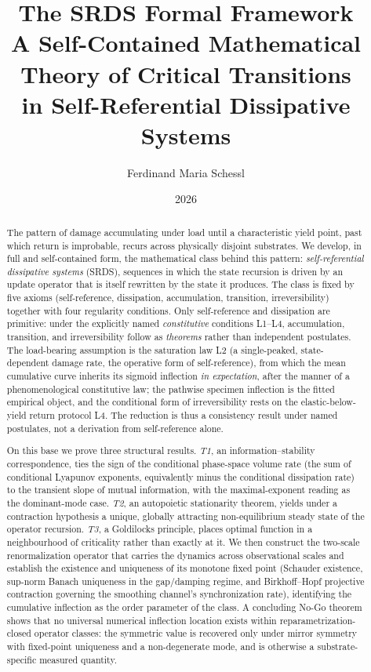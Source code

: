 \documentclass[11pt]{article}
\title{\textbf{The SRDS Formal Framework}\\[0.3em]
\large A Self-Contained Mathematical Theory of Critical Transitions\\ in Self-Referential Dissipative Systems}
\author{Ferdinand Maria Schessl}
\date{2026}
\theoremstyle{plain}
\theoremstyle{definition}
\theoremstyle{remark}
\begin{document}
\maketitle

\begin{abstract}
The pattern of damage accumulating under load until a characteristic yield point, past which return is improbable, recurs across physically disjoint substrates. We develop, in full and self-contained form, the mathematical class behind this pattern: \emph{self-referential dissipative systems} (SRDS), sequences in which the state recursion is driven by an update operator that is itself rewritten by the state it produces. The class is fixed by five axioms (self-reference, dissipation, accumulation, transition, irreversibility) together with four regularity conditions. Only self-reference and dissipation are primitive: under the explicitly named \emph{constitutive} conditions L1--L4, accumulation, transition, and irreversibility follow as \emph{theorems} rather than independent postulates. The load-bearing assumption is the saturation law L2 (a single-peaked, state-dependent damage rate, the operative form of self-reference), from which the mean cumulative curve inherits its sigmoid inflection \emph{in expectation}, after the manner of a phenomenological constitutive law; the pathwise specimen inflection is the fitted empirical object, and the conditional form of irreversibility rests on the elastic-below-yield return protocol L4. The reduction is thus a consistency result under named postulates, not a derivation from self-reference alone.

On this base we prove three structural results. \emph{T1}, an information--stability correspondence, ties the sign of the conditional phase-space volume rate (the sum of conditional Lyapunov exponents, equivalently minus the conditional dissipation rate) to the transient slope of mutual information, with the maximal-exponent reading as the dominant-mode case. \emph{T2}, an autopoietic stationarity theorem, yields under a contraction hypothesis a unique, globally attracting non-equilibrium steady state of the operator recursion. \emph{T3}, a Goldilocks principle, places optimal function in a neighbourhood of criticality rather than exactly at it. We then construct the two-scale renormalization operator that carries the dynamics across observational scales and establish the existence and uniqueness of its monotone fixed point (Schauder existence, sup-norm Banach uniqueness in the gap/damping regime, and Birkhoff--Hopf projective contraction governing the smoothing channel's synchronization rate), identifying the cumulative inflection as the order parameter of the class. A concluding No-Go theorem shows that no universal numerical inflection location exists within reparametrization-closed operator classes: the symmetric value is recovered only under mirror symmetry with fixed-point uniqueness and a non-degenerate mode, and is otherwise a substrate-specific measured quantity.


\end{abstract}
\end{document}
